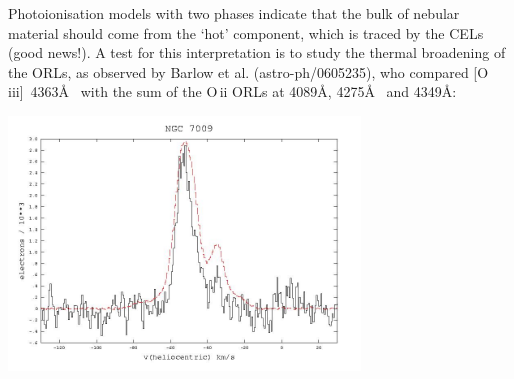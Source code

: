 \foilhead{}
Photoionisation models with two phases indicate that the bulk of
nebular material should come from the `hot' component, which is traced
by the CELs (good news!). A test for this interpretation is to study
the thermal broadening of the ORLs, as observed by Barlow et
al. (astro-ph/0605235), who compared [O\,{\sc iii}]~4363\AA~ with the
sum of the O\,{\sc ii} ORLs at 4089\AA, 4275\AA~ and 4349\AA:
\begin{center}
      \includegraphics[width=0.7\textwidth,height=!]{./C/n7009_bHROS.jpg}
\end{center}


